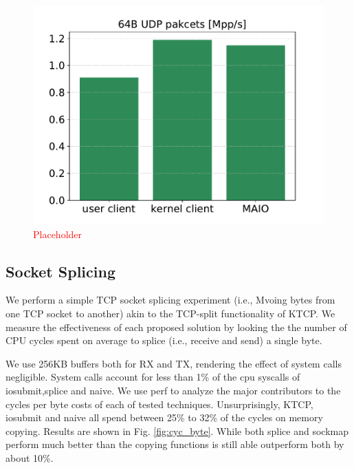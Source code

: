 \begin{figure}[t]
    \centering
    \includegraphics[width=\columnwidth]{bifurcated.pdf}
    \caption{\textcolor{red}{Placeholder}}
    \label{fig:tx_compare}
\end{figure}
\subsection{Socket Splicing}
We perform a simple TCP socket splicing experiment (i.e., Mvoing bytes from one TCP socket to another) akin to the TCP-split functionality of KTCP. We measure the effectiveness of each proposed solution by looking the the number of CPU cycles spent on average to splice (i.e., receive and send) a single byte.

We use 256KB buffers both for RX and TX, rendering the effect of system calls negligible. System calls account for less than 1\% of the cpu syscalls of iosubmit,splice and naive. We use perf\cite{perf} to analyze the major contributors to the cycles per byte costs of each of tested techniques. Unsurprisingly, KTCP, iosubmit and naive all spend between 25\% to 32\% of the cycles on memory copying. Results are shown in Fig. \ref{fig:cyc_byte}. While both splice and sockmap perform much better than the copying functions \oursys is still able outperform both by about 10\%.




